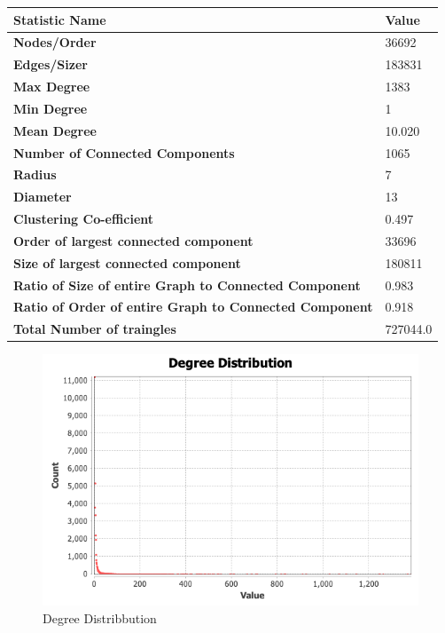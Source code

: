 \documentclass[11pt, oneside]{article}   	%
\begin{document}
	\begin{center}
 \begin{tabular}{||p{12cm}||p{5cm}|}
\hline 
\textbf{Statistic Name} & \textbf{Value} \\ \hline
 \textbf{Nodes/Order} & 36692  \\  
 \hline
 \textbf{Edges/Sizer} & 183831  \\  
 \hline
 \textbf{Max Degree} & 1383\\  
 \hline
 \textbf{Min Degree} & 1\\  
 \hline
 \textbf{Mean Degree} & 10.020\\  
 \hline
 \textbf{Number of Connected Components} & 1065\\  
 \hline
  \textbf{Radius} & 7\\  
 \hline
 \textbf{Diameter} & 13\\  
 \hline
 \textbf{Clustering Co-efficient} & 0.497\\  
 \hline
 \hline
 \textbf{Order of largest connected component} & 33696\\  
 \hline
 \textbf{Size of largest connected component} & 180811\\  
 \hline
 \textbf{Ratio of Size of entire Graph to Connected Component} & 0.983\\  
 \hline
 \textbf{Ratio of Order of entire Graph to Connected Component} & 0.918\\  
 \hline
 \textbf{Total Number of traingles} & 727044.0\\  
 \hline
\end{tabular}
\label{summarystats}

\begin{figure}
  \centering
  \includegraphics[width=\columnwidth]{degree-distribution.png}
  \caption{Degree Distribbution }
\end{figure}

\end{center} 
\end{document}
